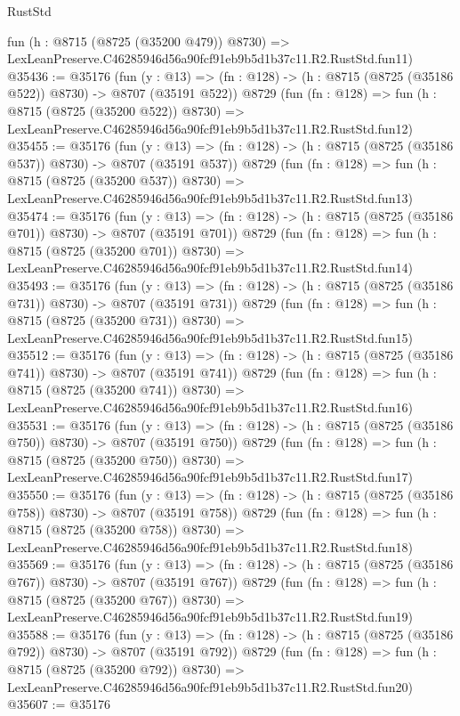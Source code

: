 \begin{lexlean}{RustStd}
\begin{coremodule}
    fun (h : @8715 (@8725 (@35200 @479)) @8730) =>
    LexLeanPreserve.C46285946d56a90fcf91eb9b5d1b37c11.R2.RustStd.fun11)
@35436 := @35176
    (fun (y : @13) => (fn : @128) -> (h : @8715 (@8725 (@35186 @522)) @8730) -> @8707 (@35191 @522))
    @8729
    (fun (fn : @128) =>
    fun (h : @8715 (@8725 (@35200 @522)) @8730) =>
    LexLeanPreserve.C46285946d56a90fcf91eb9b5d1b37c11.R2.RustStd.fun12)
@35455 := @35176
    (fun (y : @13) => (fn : @128) -> (h : @8715 (@8725 (@35186 @537)) @8730) -> @8707 (@35191 @537))
    @8729
    (fun (fn : @128) =>
    fun (h : @8715 (@8725 (@35200 @537)) @8730) =>
    LexLeanPreserve.C46285946d56a90fcf91eb9b5d1b37c11.R2.RustStd.fun13)
@35474 := @35176
    (fun (y : @13) => (fn : @128) -> (h : @8715 (@8725 (@35186 @701)) @8730) -> @8707 (@35191 @701))
    @8729
    (fun (fn : @128) =>
    fun (h : @8715 (@8725 (@35200 @701)) @8730) =>
    LexLeanPreserve.C46285946d56a90fcf91eb9b5d1b37c11.R2.RustStd.fun14)
@35493 := @35176
    (fun (y : @13) => (fn : @128) -> (h : @8715 (@8725 (@35186 @731)) @8730) -> @8707 (@35191 @731))
    @8729
    (fun (fn : @128) =>
    fun (h : @8715 (@8725 (@35200 @731)) @8730) =>
    LexLeanPreserve.C46285946d56a90fcf91eb9b5d1b37c11.R2.RustStd.fun15)
@35512 := @35176
    (fun (y : @13) => (fn : @128) -> (h : @8715 (@8725 (@35186 @741)) @8730) -> @8707 (@35191 @741))
    @8729
    (fun (fn : @128) =>
    fun (h : @8715 (@8725 (@35200 @741)) @8730) =>
    LexLeanPreserve.C46285946d56a90fcf91eb9b5d1b37c11.R2.RustStd.fun16)
@35531 := @35176
    (fun (y : @13) => (fn : @128) -> (h : @8715 (@8725 (@35186 @750)) @8730) -> @8707 (@35191 @750))
    @8729
    (fun (fn : @128) =>
    fun (h : @8715 (@8725 (@35200 @750)) @8730) =>
    LexLeanPreserve.C46285946d56a90fcf91eb9b5d1b37c11.R2.RustStd.fun17)
@35550 := @35176
    (fun (y : @13) => (fn : @128) -> (h : @8715 (@8725 (@35186 @758)) @8730) -> @8707 (@35191 @758))
    @8729
    (fun (fn : @128) =>
    fun (h : @8715 (@8725 (@35200 @758)) @8730) =>
    LexLeanPreserve.C46285946d56a90fcf91eb9b5d1b37c11.R2.RustStd.fun18)
@35569 := @35176
    (fun (y : @13) => (fn : @128) -> (h : @8715 (@8725 (@35186 @767)) @8730) -> @8707 (@35191 @767))
    @8729
    (fun (fn : @128) =>
    fun (h : @8715 (@8725 (@35200 @767)) @8730) =>
    LexLeanPreserve.C46285946d56a90fcf91eb9b5d1b37c11.R2.RustStd.fun19)
@35588 := @35176
    (fun (y : @13) => (fn : @128) -> (h : @8715 (@8725 (@35186 @792)) @8730) -> @8707 (@35191 @792))
    @8729
    (fun (fn : @128) =>
    fun (h : @8715 (@8725 (@35200 @792)) @8730) =>
    LexLeanPreserve.C46285946d56a90fcf91eb9b5d1b37c11.R2.RustStd.fun20)
@35607 := @35176

\end{coremodule}
\end{lexlean}

